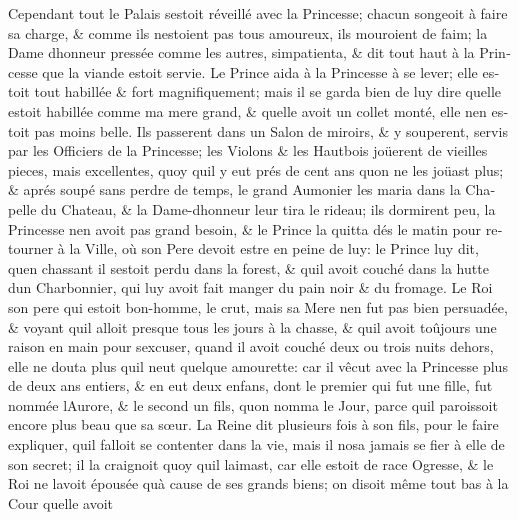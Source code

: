 \documentclass[14pt,a4paper]{memoir}
\begin{document}
\begin{otherlanguage}{french}
Cependant tout le Palais s\textquotesingle estoit réveillé avec la
Princesse; chacun songeoit à faire sa charge, \& comme ils
n\textquotesingle estoient pas tous amoureux, ils mouroient de faim; la
Dame d\textquotesingle honneur pressée comme les autres,
s\textquotesingle impatienta, \& dit tout haut à la Princesse que la
viande estoit servie. Le Prince aida à la Princesse à se lever; elle
estoit tout habillée \& fort magnifiquement; mais il se garda bien de
luy dire qu\textquotesingle elle estoit habillée comme ma mere grand, \&
qu\textquotesingle elle avoit un collet monté, elle n\textquotesingle en
estoit pas moins belle. Ils passerent dans un Salon de miroirs, \& y
souperent, servis par les Officiers de la Princesse; les Violons \& les
Hautbois joüerent de vieilles pieces, mais excellentes, quoy
qu\textquotesingle il y eut prés de cent ans qu\textquotesingle on ne
les joüast plus; \& aprés soupé sans perdre de temps, le grand Aumonier
les maria dans la Chapelle du Chateau, \& la
Dame-d\textquotesingle honneur leur tira le rideau; ils dormirent peu,
la Princesse n\textquotesingle en avoit pas grand besoin, \& le Prince
la quitta dés le matin pour retourner à la Ville, où son Pere devoit
estre en peine de luy: le Prince luy dit, qu\textquotesingle en chassant
il s\textquotesingle estoit perdu dans la forest, \&
qu\textquotesingle il avoit couché dans la hutte d\textquotesingle un
Charbonnier, qui luy avoit fait manger du pain noir \& du fromage. Le
Roi son pere qui estoit bon-homme, le crut, mais sa Mere
n\textquotesingle en fut pas bien persuadée, \& voyant
qu\textquotesingle il alloit presque tous les jours à la chasse, \&
qu\textquotesingle il avoit toûjours une raison en main pour
s\textquotesingle excuser, quand il avoit couché deux ou trois nuits
dehors, elle ne douta plus qu\textquotesingle il n\textquotesingle eut
quelque amourette: car il vêcut avec la Princesse plus de deux ans
entiers, \& en eut deux enfans, dont le premier qui fut une fille, fut
nommée l\textquotesingle Aurore, \& le second un fils,
qu\textquotesingle on nomma le Jour, parce qu\textquotesingle il
paroissoit encore plus beau que sa sœur. La Reine dit plusieurs fois à
son fils, pour le faire expliquer, qu\textquotesingle il falloit se
contenter dans la vie, mais il n\textquotesingle osa jamais se fier à
elle de son secret; il la craignoit quoy qu\textquotesingle il
l\textquotesingle aimast, car elle estoit de race Ogresse, \& le Roi ne
l\textquotesingle avoit épousée qu\textquotesingle à cause de ses grands
biens; on disoit même tout bas à la Cour qu\textquotesingle elle avoit

\end{otherlanguage}
\end{document}
